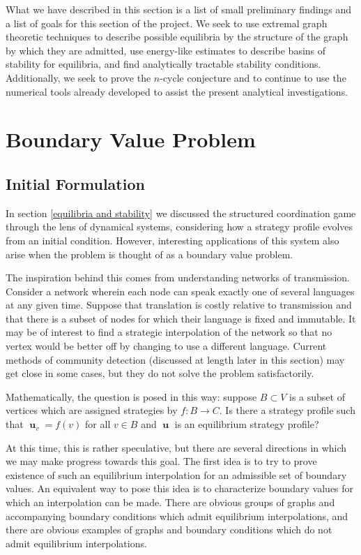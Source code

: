 \documentclass[]{article}
\DeclareMathOperator{\uu}{\mathbf{u}}
\begin{document}
		What we have described in this section is a list of small preliminary findings and a list of goals for this section of the project. We seek to use extremal graph theoretic techniques to describe possible equilibria by the structure of the graph by which they are admitted, use energy-like estimates to describe basins of stability for equilibria, and find analytically tractable stability conditions. Additionally, we seek to prove the $n$-cycle conjecture and to continue to use the numerical tools already developed to assist the present analytical investigations.  
	
\section{Boundary Value Problem}\label{boundaryvalueproblem}
	\subsection{Initial Formulation}\label{initialformulation}
		In section \ref{equilibria and stability} we discussed the structured coordination game through the lens of dynamical systems, considering how a strategy profile evolves from an initial condition. However, interesting applications of this system also arise when the problem is thought of as a boundary value problem. 
		
		The inspiration behind this comes from understanding networks of transmission. Consider a network wherein each node can speak exactly one of several languages at any given time. Suppose that translation is costly relative to transmission and that there is a subset of nodes for which their language is fixed and immutable. It may be of interest to find a strategic interpolation of the network so that no vertex would be better off by changing to use a different language. Current methods of community detection (discussed at length later in this section) may get close in some cases, but they do not solve the problem satisfactorily. 
		
		Mathematically, the question is posed in this way: suppose $B\subset V$ is a subset of vertices which are assigned strategies by $f:B\rightarrow C$. Is there a strategy profile such that $\uu_v=f(v)$ for all $v\in B$ and $\uu$ is an equilibrium strategy profile?

		At this time, this is rather speculative, but there are several directions in which we may make progress towards this goal. The first idea is to try to prove existence of such an equilibrium interpolation for an admissible set of boundary values. An equivalent way to pose this idea is to characterize boundary values for which an interpolation can be made. There are obvious groups of graphs and accompanying boundary conditions which admit equilibrium interpolations, and there are obvious examples of graphs and boundary conditions which do not admit equilibrium interpolations.
		
\end{document}
